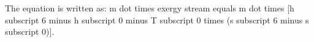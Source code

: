 The equation is written as:  
m dot times exergy stream equals m dot times [h subscript 6 minus h subscript 0 minus T subscript 0 times (s subscript 6 minus s subscript 0)].